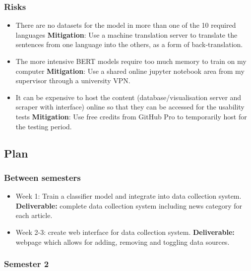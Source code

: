 \documentclass[11pt]{article}
\begin{document}
\subsubsection{Risks}\label{risks}

\begin{itemize}
\tightlist
\item There are no datasets for the model in more than one of the 10 required languages \textbf{Mitigation}: Use a machine translation server to translate the sentences from one language into the others, as a form of back-translation.
\item  The more intensive BERT models require too much memory to train on my computer \textbf{Mitigation}: Use a shared online jupyter notebook area from my supervisor through a university VPN.
\item It can be expensive to host the content (database/visualisation server and scraper with interface) online so that they can be accessed for the usability tests \textbf{Mitigation}: Use free credits from GitHub Pro to temporarily host for the testing period.
\end{itemize}

\subsection{Plan}\label{plan}

\subsubsection{Between semesters}

\begin{itemize}
    \tightlist
    \item
      Week 1: Train a classifier model and integrate into data collection system. \textbf{Deliverable:}
      complete data collection system including news category for each article.
    \item
      Week 2-3: create web interface for data collection system.
      \textbf{Deliverable:} webpage which allows for adding, removing and toggling data sources.
    \end{itemize}

\subsubsection{Semester 2}
\end{document}
